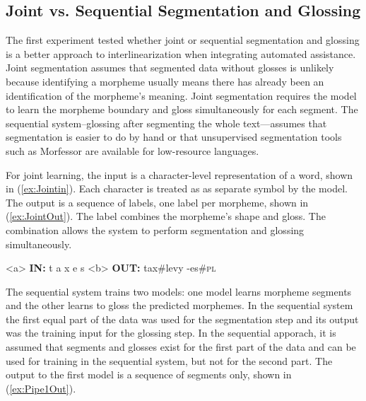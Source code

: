 

\subsection{Joint vs. Sequential Segmentation and Glossing}
\label{sec:joint}

The first experiment tested whether joint or sequential segmentation and glossing is a better approach to interlinearization when integrating automated assistance. Joint segmentation assumes that segmented data without glosses is unlikely because identifying a morpheme usually means there has already been an identification of the morpheme's meaning.
Joint segmentation requires the model to learn the morpheme boundary and gloss simultaneously for each segment. The sequential system--glossing after segmenting the whole text---assumes that segmentation is easier to do by hand or that unsupervised segmentation tools such as Morfessor \citep{smit-etal-2014-morfessor} are available for low-resource languages. 

For joint learning, the input is a character-level representation of a word, shown in (\ref{ex:Jointin}). Each character is treated as as separate symbol by the model. The output is a sequence of labels, one label per morpheme, shown in (\ref{ex:JointOut}). The label combines the morpheme's shape and gloss. The combination allows the system to perform segmentation and glossing simultaneously. 

\pex   
\label{ex:JointInOut}
\a<a> \textbf{IN:} \hspace{6 mm} t \hspace{2 mm} a \hspace{2 mm} x \hspace{2 mm} e \hspace{2 mm} s 
\label{ex:Jointin}
\a<b> \textbf{OUT:} \hspace{2 mm} tax\#levy \hspace{3 mm} -es\#\textsc{pl} 
\label{ex:JointOut}
\xe

The sequential system trains two models: one model learns morpheme segments and the other learns to gloss the predicted morphemes. In the sequential system the first equal part of the data was used for the segmentation step and its output was the training input for the glossing step. In the sequential apporach, it is assumed that segments and glosses exist for the first part of the data and can be used for training in the sequential system, but not for the second part. The output to the first model is a sequence of segments only, shown in (\ref{ex:Pipe1Out}). 

